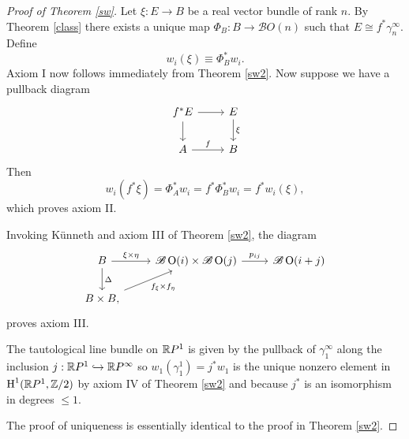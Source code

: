\documentclass{amsart}
\begin{document}
\begin{proof}[Proof of Theorem \ref{sw}]
    Let $\xi:E\to B$ be a real vector bundle of rank $n$. By Theorem \ref{class} there exists a
    unique map $\Phi_B:B\to\mathscr{B}O(n)$ such that $E\cong f^*\gamma_n^\infty$.
    Define
    \begin{equation*}
        w_i(\xi) \equiv \Phi_B^*w_i.
    \end{equation*}
    Axiom I now follows immediately from Theorem \ref{sw2}. Now suppose we have a pullback
    diagram
    \begin{equation*}
        \begin{tikzcd}
            f^*E\ar{r}\ar{d} & E\ar{d}{\xi}\\
            A\ar{r}{f} & B
        \end{tikzcd}
    \end{equation*}
    Then
    \begin{equation*}
        w_i(f^*\xi) = \Phi_A^*w_i = f^*\Phi_B^*w_i = f^*w_i(\xi),
    \end{equation*}
    which proves axiom II.

    Invoking K\"unneth and axiom III of Theorem \ref{sw2}, the diagram
    \begin{equation*}
        \begin{tikzcd}
            B\ar{r}{\xi\times\eta}\ar{d}{\Delta} & \mathscr{B}\OO(i)\times\mathscr{B}\OO(j)\ar{r}{p_{ij}} & \mathscr{B}\OO(i+j)\\
            B\times B\ar[swap]{ru}{f_\xi\times f_\eta},
        \end{tikzcd}
    \end{equation*}
    proves axiom III.

    The tautological line bundle on $\mathbb{R} P^1$ is given by the pullback of $\gamma_1^\infty$
    along the inclusion $j:\mathbb{R} P^1\hookrightarrow\mathbb{R} P^\infty$ so $w_1(\gamma_1^1)=j^*w_1$
    is the unique nonzero element in $\operatorname{H}^1(\mathbb{R} P^1,\mathbb{Z}/2)$ by axiom IV of Theorem \ref{sw2}
    and because $j^*$ is an isomorphism in degrees $\leqslant 1$.

    The proof of uniqueness is essentially identical to the proof in Theorem \ref{sw2}.
\end{proof}
\end{document}
